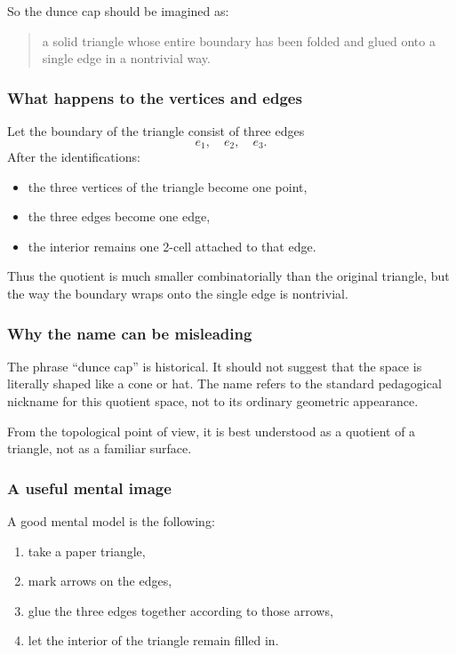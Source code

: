 \documentclass[12pt,a4paper]{article}
\theoremstyle{notespace}
\begin{document}
So the dunce cap should be imagined as:

\begin{quote}
	a solid triangle whose entire boundary has been folded and glued onto a single edge in a nontrivial way.
\end{quote}

\subsubsection{What happens to the vertices and edges}

Let the boundary of the triangle consist of three edges
\[
e_1,\quad e_2,\quad e_3.
\]
After the identifications:

\begin{itemize}
	\item the three vertices of the triangle become one point,
	\item the three edges become one edge,
	\item the interior remains one 2-cell attached to that edge.
\end{itemize}

Thus the quotient is much smaller combinatorially than the original triangle, but the way the boundary wraps onto the single edge is nontrivial.

\subsubsection{Why the name can be misleading}

The phrase ``dunce cap'' is historical. It should not suggest that the space is literally shaped like a cone or hat. The name refers to the standard pedagogical nickname for this quotient space, not to its ordinary geometric appearance.

From the topological point of view, it is best understood as a quotient of a triangle, not as a familiar surface.

\subsubsection{A useful mental image}

A good mental model is the following:

\begin{enumerate}
	\item take a paper triangle,
	\item mark arrows on the edges,
	\item glue the three edges together according to those arrows,
	\item let the interior of the triangle remain filled in.
\end{enumerate}
\end{document}
